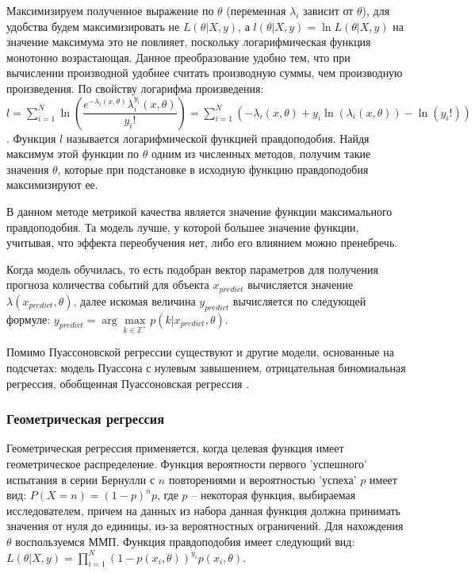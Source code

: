 Максимизируем полученное выражение по $\theta$ (переменная $\lambda_i$ зависит от $\theta$), для удобства будем максимизировать не $L(\theta | X,y)$, а $l(\theta | X,y) = \ln L(\theta | X,y)$ на значение максимума это не повлияет, поскольку логарифмическая функция монотонно возрастающая. Данное преобразование удобно тем, что при вычислении производной удобнее считать производную суммы, чем производную произведения. По свойству логарифма произведения: $l = \sum\limits_{i=1}^{N} \ln \left( \dfrac{e^{-\lambda_i(x, \theta)} \lambda_i^{y_i}(x, \theta)}{y_i!} \right) = \sum\limits_{i=1}^{N} \left( -\lambda_i(x, \theta) + y_i \ln(\lambda_i(x, \theta)) - \ln(y_i!) \right)$. Функция $l$ называется логарифмической функцией правдоподобия. Найдя максимум этой функции по $\theta$ одним из численных методов, получим такие значения $\theta$, которые при подстановке в исходную функцию правдоподобия максимизируют ее.

В данном методе метрикой качества является значение функции максимального правдоподобия. Та модель лучше, у которой большее значение функции, учитывая, что эффекта переобучения нет, либо его влиянием можно пренебречь.

Когда модель обучилась, то есть подобран вектор параметров для получения прогноза количества событий для объекта $x_{predict}$ вычисляется значение $\lambda(x_{predict}, \theta)$, далее искомая величина $y_{predict}$ вычисляется по следующей формуле: $y_{predict} = \arg\max\limits_{k \in \mathbb{Z}^+} p(k | x_{predict}, \theta)$.

Помимо Пуассоновской регрессии существуют и другие модели, основанные на подсчетах: модель Пуассона с нулевым завышением, отрицательная биномиальная регрессия, обобщенная Пуассоновская регрессия \cite{towardsdatascience:poisson_regression}.


\subsubsection{Геометрическая регрессия}

Геометрическая регрессия применяется, когда целевая функция имеет геометрическое распределение. Функция вероятности первого 'успешного' испытания в серии Бернулли с $n$ повторениями и вероятностью 'успеха' $p$ имеет вид: $P(X=n)=(1-p)^{n}p$, где $p$ -- некоторая функция, выбираемая исследователем, причем на данных из набора данная функция должна принимать значения от нуля до единицы, из-за вероятностных ограничений. Для нахождения $\theta$ воспользуемся ММП. Функция правдоподобия имеет следующий вид: $L(\theta | X,y) = \prod\limits_{i = 1}^N (1-p(x_i,\theta))^{y_i}p(x_i,\theta)$.

